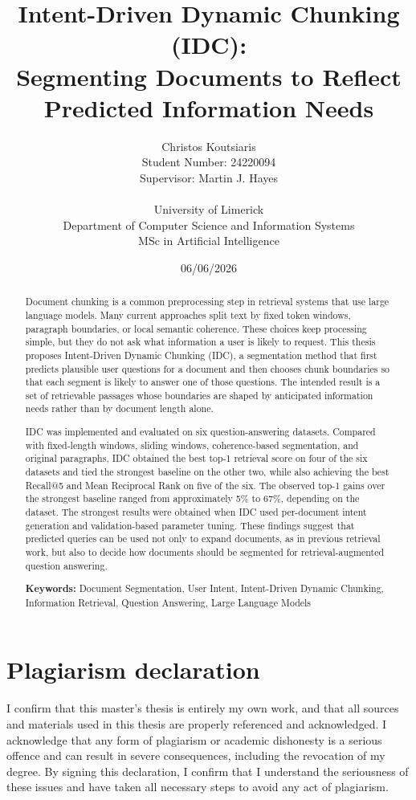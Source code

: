 \documentclass[12pt,a4paper]{report}
\title{Intent-Driven Dynamic Chunking (IDC):\\Segmenting Documents to Reflect Predicted Information Needs}
\author{Christos Koutsiaris\\
Student Number: 24220094\\
Supervisor: Martin J. Hayes\\
\\
University of Limerick\\
Department of Computer Science and Information Systems\\
MSc in Artificial Intelligence}
\date{06/06/2026}
\begin{document}
\maketitle


\newpage

\begin{abstract}
Document chunking is a common preprocessing step in retrieval systems that use large language models. Many current approaches split text by fixed token windows, paragraph boundaries, or local semantic coherence. These choices keep processing simple, but they do not ask what information a user is likely to request. This thesis proposes Intent-Driven Dynamic Chunking (IDC), a segmentation method that first predicts plausible user questions for a document and then chooses chunk boundaries so that each segment is likely to answer one of those questions. The intended result is a set of retrievable passages whose boundaries are shaped by anticipated information needs rather than by document length alone.

IDC was implemented and evaluated on six question-answering datasets. Compared with fixed-length windows, sliding windows, coherence-based segmentation, and original paragraphs, IDC obtained the best top-1 retrieval score on four of the six datasets and tied the strongest baseline on the other two, while also achieving the best Recall@5 and Mean Reciprocal Rank on five of the six. The observed top-1 gains over the strongest baseline ranged from approximately 5\% to 67\%, depending on the dataset. The strongest results were obtained when IDC used per-document intent generation and validation-based parameter tuning. These findings suggest that predicted queries can be used not only to expand documents, as in previous retrieval work, but also to decide how documents should be segmented for retrieval-augmented question answering.

\textbf{Keywords:} Document Segmentation, User Intent, Intent-Driven Dynamic Chunking, Information Retrieval, Question Answering, Large Language Models
\end{abstract}

\newpage

\section*{Plagiarism declaration}
I confirm that this master's thesis is entirely my own work, and that all sources and materials used in this thesis are properly referenced and acknowledged. I acknowledge that any form of plagiarism or academic dishonesty is a serious offence and can result in severe consequences, including the revocation of my degree. By signing this declaration, I confirm that I understand the seriousness of these issues and have taken all necessary steps to avoid any act of plagiarism.
\end{document}
